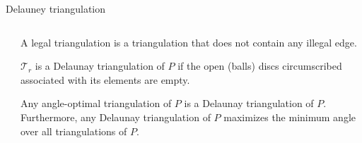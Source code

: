 \documentclass[10pt]{beamer}
\begin{document}
\begin{frame}{Delauney triangulation}
\begin{columns}
		\begin{column}{0.4\textwidth} 
		\end{column}
		\begin{column}{0.6\textwidth}
			A \alert{legal} triangulation is a triangulation that does not contain
			any illegal edge.
			\bigskip
	
			$\mathcal{T}_r$ is a \alert{Delaunay triangulation} of $P$  
			if the open (balls) discs circumscribed associated with its elements are empty.
			\bigskip
	
			Any angle-optimal triangulation of $P$ is a Delaunay triangulation of $P$.
			Furthermore, any Delaunay triangulation of $P$ maximizes the minimum angle
			over all triangulations of $P$.
		\end{column}
	\end{columns}
\end{frame}
\end{document}
